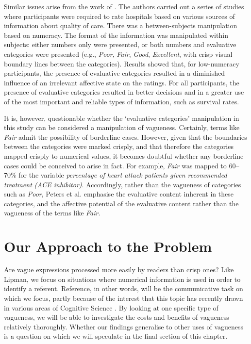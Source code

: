 \documentclass[ %
  graybox       %
 ,envcountchap  %
 ,sectrefs      %
]{svmono}
\begin{document}
Similar issues arise from the work of \citet{peters2009bringing}. The authors carried out a series of studies where participants were required to rate hospitals based on various sources of information about quality of care. There was a between-subjects manipulation based on numeracy. The format of the information was manipulated within subjects: either numbers only were presented, or both numbers and evaluative categories were presented (e.g., \emph{Poor}, \emph{Fair}, \emph{Good}, \emph{Excellent}, with crisp visual boundary lines between the categories). Results showed that, for low-numeracy participants, the presence of evaluative categories resulted in a diminished influence of an irrelevant affective state on the ratings. For all participants, the presence of evaluative categories resulted in better decisions and in a greater use of the most important and reliable types of information, such as survival rates.

It is, however, questionable whether the `evaluative categories' manipulation in this study can be considered a manipulation of vagueness. Certainly, terms like \emph{Fair} admit the possibility of borderline cases. However, given that the boundaries between the categories were marked crisply, and that therefore the categories mapped crisply to numerical values, it becomes doubtful whether any borderline cases could be conceived to arise in fact. For example, \emph{Fair} was mapped to 60--70\% for the variable \emph{percentage of heart attack patients given recommended treatment (ACE inhibitor)}. Accordingly, rather than the vagueness of categories such as \emph{Poor}, Peters et al. emphasise the evaluative content inherent in these categories, and the affective potential of the evaluative content rather than the vagueness of the terms like {\em Fair}.

\section{Our Approach to the Problem}
Are vague expressions processed more easily by readers than crisp ones? Like Lipman, we focus on situations where numerical information is used in order to identify a referent. Reference, in other words, will be the communicative task on which we focus, partly because of the interest that this topic has recently drawn in various areas of Cognitive Science \citep{vanDeemterCMR}. By looking at one specific type of vagueness, we will be able to investigate the costs and benefits of vagueness relatively thoroughly. Whether our findings generalise to other uses of vagueness is a question on which we will speculate in the final section of this chapter.
\end{document}
